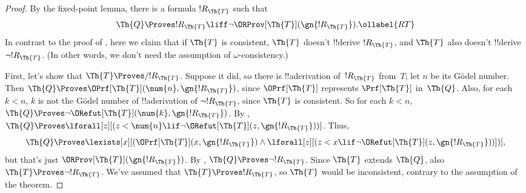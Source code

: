\documentclass[../../../include/open-logic-section]{subfiles}
\begin{document}
\begin{proof}
By the fixed-point lemma, there is a formula $!R_\Th{T}$ such that
\begin{equation}
  \Th{Q} \Proves !R_\Th{T} \liff \lnot \ORProv[\Th{T}](\gn{!R_\Th{T}}).
  \ollabel{RT}
\end{equation}
In contrast to the proof of ,
here we claim that if $\Th{T}$ is consistent, $\Th{T}$ doesn't !!{derive}
$!R_\Th{T}$, and $\Th{T}$ also doesn't !!{derive} $\lnot !R_\Th{T}$. (In
other words, we don't need the assumption of $\omega$-consistency.)

First, let's show that $\Th{T} \Proves/ !R_{\Th{T}}$.  Suppose it did, so
there is !!a{derivation} of~$!R_{\Th{T}}$ from~$T$; let $n$ be its G\"odel
number. Then $\Th{Q} \Proves \OPrf[\Th{T}](\num{n}, \gn{!R_{\Th{T}}})$, since
$\OPrf[\Th{T}]$ represents $\Prf[\Th{T}]$ in~$\Th{Q}$. Also, for each $k < n$,
$k$ is not the G\"odel number of !!a{derivation} of $\lnot !R_{\Th{T}}$, since $\Th{T}$ is
consistent. So for each $k < n$, $\Th{Q} \Proves \lnot
\ORefut[\Th{T}](\num{k}, \gn{!R_{\Th{T}}})$. By ,
$\Th{Q} \Proves \lforall[z][(z < \num{n} \lif \lnot \ORefut[\Th{T}](z,
  \gn{!R_{\Th{T}}}))]$. Thus,
\[
\Th{Q} \Proves \lexists[x][(\OPrf[\Th{T}](x,\gn{!R_{\Th{T}}}) \land \lforall[z][(z
    < x \lif \lnot \ORefut[\Th{T}](z,\gn{!R_{\Th{T}}}))])],
\]
but that's just $\ORProv[\Th{T}](\gn{!R_{\Th{T}}})$. By , $\Th{Q}
\Proves \lnot !R_{\Th{T}}$. Since $\Th{T}$ extends $\Th{Q}$, also $\Th{T}
\Proves \lnot !R_{\Th{T}}$. We've assumed that $\Th{T} \Proves !R_{\Th{T}}$, so
$\Th{T}$ would be inconsistent, contrary to the assumption of the
theorem.


\end{proof}
\end{document}
